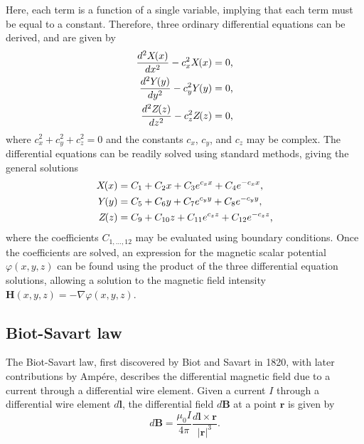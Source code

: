Here, each term is a function of a single variable, implying that each term must be equal to a constant. Therefore, three ordinary differential equations can be derived, and are given by
\begin{align}
    \frac{d^2 X\hspace{-1mm}\left(x\right)}{dx^2} - c_x^2 X\hspace{-1mm}\left(x\right) &= 0 \nonumber \text{,} \\
    \frac{d^2 Y\hspace{-1mm}\left(y\right)}{dy^2} - c_y^2 Y\hspace{-1mm}\left(y\right) &= 0 \text{,} \\
    \frac{d^2 Z\hspace{-1mm}\left(z\right)}{dz^2} - c_z^2 Z\hspace{-1mm}\left(z\right) &= 0 \nonumber \text{,}
\end{align}
where \(c_x^2+c_y^2+c_z^2=0\) and the constants \(c_x\), \(c_y\), and \(c_z\) may be complex. The differential equations can be readily solved using standard methods, giving the general solutions
\begin{align}
    X\hspace{-1mm}\left(x\right) &= C_1 + C_2x + C_3 e^{c_xx} + C_4 e^{-c_xx} \text{,} \nonumber \\
    Y\hspace{-1mm}\left(y\right) &= C_5 + C_6y + C_7 e^{c_yy} + C_8 e^{-c_yy} \text{,} \\
    Z\hspace{-1mm}\left(z\right) &= C_9 + C_{10}z + C_{11} e^{c_zz} + C_{12} e^{-c_zz} \nonumber \text{,}
\end{align}
where the coefficients \(C_{1,\dots,12}\) may be evaluated using boundary conditions.
Once the coefficients are solved, an expression for the magnetic scalar potential \(\varphi\left(x,y,z\right)\) can be found using the product of the three differential equation solutions, allowing a solution to the magnetic field intensity \(\mathbf{H}\left(x,y,z\right) = -\nabla \varphi \left(x,y,z\right)\).

\subsection{Biot-Savart law}
The Biot-Savart law, first discovered by Biot and Savart in 1820, with later contributions by Amp\'ere, describes the differential magnetic field due to a current through a differential wire element. Given a current \(I\) through a differential wire element \(d\mathbf{l}\), the differential field \(d\mathbf{B}\) at a point \(\mathbf{r}\) is given \cite{Jackson1998} by
\begin{equation}\label{eqn:biotSavartField}
    d\mathbf{B} = \frac{\mu_0 I}{4\pi} \frac{d\mathbf{l} \times \mathbf{r}}{\left| \mathbf{r} \right|^3} \text{.}
\end{equation}

